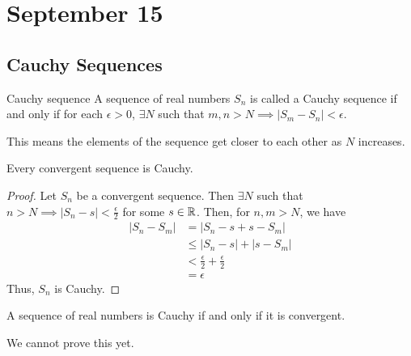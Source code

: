 \section{September 15}

\subsection{Cauchy Sequences}
\begin{definition}{Cauchy sequence}{}
    A sequence of real numbers $S_n$ is called a Cauchy sequence if and only if for each $\epsilon > 0$, $\exists N$ such that $m, n > N \implies |S_m - S_n| < \epsilon$.
\end{definition}
\begin{note}
    This means the elements of the sequence get closer to each other as $N$ increases.
\end{note}

\begin{theorem}{}{}
    Every convergent sequence is Cauchy.
\end{theorem}
\begin{proof}
    Let $S_n$ be a convergent sequence. Then $\exists N$ such that $n > N \implies |S_n - s| < \frac{\epsilon}{2}$ for some $s \in \mathbb{R}$. Then, for $n, m > N$, we have
    \begin{align*}
        |S_n - S_m| &= |S_n - s + s - S_m| \\
        &\leq |S_n - s| + |s - S_m| \\
        &< \frac{\epsilon}{2} + \frac{\epsilon}{2} \\
        &= \epsilon
    \end{align*}
    Thus, $S_n$ is Cauchy.
\end{proof}

\begin{theorem}{}{}
    A sequence of real numbers is Cauchy if and only if it is convergent.
\end{theorem}
\begin{note}
    We cannot prove this yet.
\end{note}
